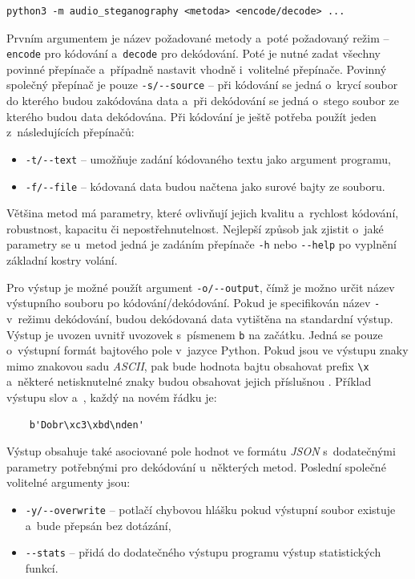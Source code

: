 \begin{verbatim}
python3 -m audio_steganography <metoda> <encode/decode> ...
\end{verbatim}

Prvním argumentem je název požadované metody a~poté požadovaný režim --
\texttt{encode} pro kódování a~\texttt{decode} pro dekódování. Poté je nutné
zadat všechny povinné přepínače a~případně nastavit vhodně i~volitelné
přepínače. Povinný společný přepínač je pouze \verb|-s/--source| -- při
kódování se jedná o~krycí soubor do kterého budou zakódována data a~při
dekódování se jedná o~stego soubor ze kterého budou data dekódována. Při
kódování je ještě potřeba použít jeden z~následujících přepínačů:

\begin{itemize}
    \item \verb|-t/--text| -- umožňuje zadání kódovaného textu jako argument
        programu,
    \item \verb|-f/--file| -- kódovaná data budou načtena jako surové bajty ze
        souboru.
\end{itemize}

Většina metod má parametry, které ovlivňují jejich kvalitu a~rychlost kódování,
robustnost, kapacitu či nepostřehnutelnost. Nejlepší způsob jak zjistit o~jaké
parametry se u~metod jedná je zadáním přepínače \verb|-h| nebo \verb|--help| po
vyplnění základní kostry volání.

Pro výstup je možné použít argument \verb|-o/--output|, čímž je možno určit
název výstupního souboru po kódování/dekódování. Pokud je specifikován název
\texttt{-} v~režimu dekódování, budou dekódovaná data vytištěna na standardní
výstup. Výstup je uvozen uvnitř uvozovek s~písmenem \texttt{b} na začátku.
Jedná se pouze o~výstupní formát bajtového pole v~jazyce Python. Pokud jsou ve
výstupu znaky mimo znakovou sadu \textit{ASCII}, pak bude hodnota bajtu
obsahovat prefix \verb|\x| a~některé netisknutelné znaky budou obsahovat jejich
příslušnou . Příklad výstupu slov  a~,
každý na novém řádku je:

\begin{verbatim}
    b'Dobr\xc3\xbd\nden'
\end{verbatim}

\noindent Výstup obsahuje také asociované pole hodnot ve formátu \textit{JSON}
s~dodatečnými parametry potřebnými pro dekódování u~některých metod. Poslední
společné volitelné argumenty jsou:

\begin{itemize}
    \item \verb|-y/--overwrite| -- potlačí chybovou hlášku pokud výstupní
        soubor existuje a~bude přepsán bez dotázání,
    \item \verb|--stats| -- přidá do dodatečného výstupu programu výstup
        statistických funkcí.
\end{itemize}

